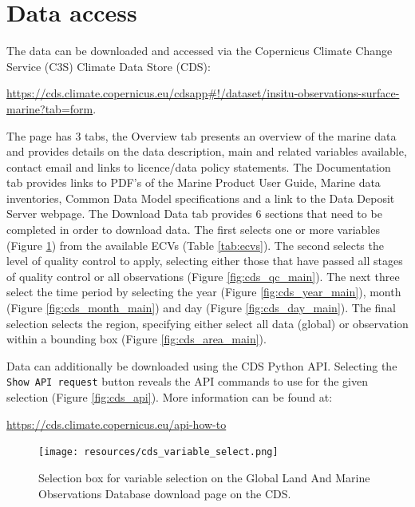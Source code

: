 \section{Data access}
The data can be downloaded and accessed via the Copernicus Climate Change Service (C3S) Climate Data Store (CDS):
\begin{center}
\sloppy\url{https://cds.climate.copernicus.eu/cdsapp#!/dataset/insitu-observations-surface-marine?tab=form}.
 \end{center}
The page has 3 tabs, the Overview tab presents an overview of the marine data and provides details on the data description, main and related variables available, contact email and links to licence/data policy statements. 
The Documentation tab provides links to PDF’s of the Marine Product User Guide, Marine data inventories, Common Data Model specifications and a link to the Data Deposit Server webpage. The Download Data tab provides 6 sections that need to be completed in order to download data. The first selects one or more variables (Figure \ref{fig:cds_variable_main}) from the available ECVs (Table \ref{tab:ecvs}). The second selects the level of quality control to apply, selecting either those that have passed all stages of quality control or all observations (Figure \ref{fig:cds_qc_main}). The next three select the time period  by selecting the year (Figure \ref{fig:cds_year_main}), month (Figure \ref{fig:cds_month_main}) and day (Figure \ref{fig:cds_day_main}). The final selection selects the region, specifying either select all data (global) or observation within a bounding box (Figure \ref{fig:cds_area_main}).

Data can additionally be downloaded using the CDS Python API. Selecting the \texttt{Show API request} button reveals the API commands to use for the given selection (Figure \ref{fig:cds_api}). More information can be found at:

\begin{center}
\url{https://cds.climate.copernicus.eu/api-how-to}
\end{center}

\begin{figure}[h]
\begin{center}
\texttt{[image: resources/cds\_variable\_select.png]}
\caption{Selection box for variable selection on the Global Land And Marine Observations Database download page on the CDS.\\}
\label{fig:cds_variable_main}
\end{center}
\end{figure}


